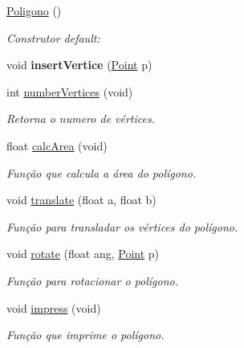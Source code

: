 \begin{DoxyCompactItemize}
\item 
\mbox{\hyperlink{class_poligono_a9311a9a1496878c09c8508b3636e2870}{Poligono}} ()
\begin{DoxyCompactList}\small\item\em Construtor default\+: \end{DoxyCompactList}\item 
\mbox{\label{class_poligono_a121937469d43a3b05a821fa14cb51e62}} 
void {\bfseries insert\+Vertice} (\mbox{\hyperlink{class_point}{Point}} p)
\item 
\mbox{\label{class_poligono_a5ce6c1bb536a15abea87aeaafcf1f045}} 
int \mbox{\hyperlink{class_poligono_a5ce6c1bb536a15abea87aeaafcf1f045}{number\+Vertices}} (void)
\begin{DoxyCompactList}\small\item\em Retorna o numero de vértices. \end{DoxyCompactList}\item 
float \mbox{\hyperlink{class_poligono_a9b2abd1369df82e2fa93a145553de590}{calc\+Area}} (void)
\begin{DoxyCompactList}\small\item\em Função que calcula a área do polígono. \end{DoxyCompactList}\item 
\mbox{\label{class_poligono_ac8c10a46cd6a60078600085fc136d65e}} 
void \mbox{\hyperlink{class_poligono_ac8c10a46cd6a60078600085fc136d65e}{translate}} (float a, float b)
\begin{DoxyCompactList}\small\item\em Função para transladar os vértices do polígono. \end{DoxyCompactList}\item 
void \mbox{\hyperlink{class_poligono_a2f0b4d5f528fa2e474b991a6806c3eef}{rotate}} (float ang, \mbox{\hyperlink{class_point}{Point}} p)
\begin{DoxyCompactList}\small\item\em Função para rotacionar o polígono. \end{DoxyCompactList}\item 
\mbox{\label{class_poligono_a1a3d812834a6898c0db3d809d1c9a974}} 
void \mbox{\hyperlink{class_poligono_a1a3d812834a6898c0db3d809d1c9a974}{impress}} (void)
\begin{DoxyCompactList}\small\item\em Função que imprime o polígono. \end{DoxyCompactList}\end{DoxyCompactItemize}


